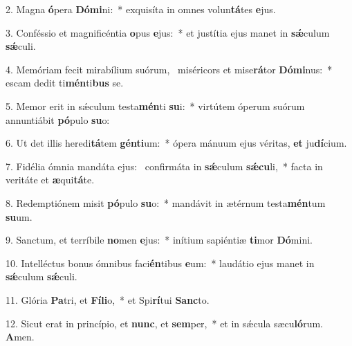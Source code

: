 2. Magna \textbf{ó}pera \textbf{Dó}\textbf{mi}ni:~*  exquisíta in omnes volun\textbf{tá}tes \textbf{e}jus.\

3. Conféssio et magnificéntia \textbf{o}pus \textbf{e}jus:~*  et justítia ejus manet in \textbf{sǽ}culum \textbf{sǽ}culi.\

4. Memóriam fecit mirabílium suórum, \dag\  miséricors et mise\textbf{rá}tor \textbf{Dó}\textbf{mi}nus:~*  escam dedit ti\textbf{mén}ti\textbf{bus} se.\

5. Memor erit in sǽculum testa\textbf{mén}ti \textbf{su}i:~*  virtútem óperum suórum annuntiábit \textbf{pó}pulo \textbf{su}o:\

6. Ut det illis heredi\textbf{tá}tem \textbf{gén}\textbf{ti}um:~*  ópera mánuum ejus véritas, \textbf{et} ju\textbf{dí}cium.\

7. Fidélia ómnia mandáta ejus: \dag\  confirmáta in \textbf{sǽ}culum \textbf{sǽ}\textbf{cu}li,~*  facta in veritáte et \textbf{æ}qui\textbf{tá}te.\

8. Redemptiónem misit \textbf{pó}pulo \textbf{su}o:~*  mandávit in ætérnum testa\textbf{mén}tum \textbf{su}um.\

9. Sanctum, et terríbile \textbf{no}men \textbf{e}jus:~*  inítium sapiéntiæ \textbf{ti}mor \textbf{Dó}mini.\

10. Intelléctus bonus ómnibus faci\textbf{én}tibus \textbf{e}um:~*  laudátio ejus manet in \textbf{sǽ}culum \textbf{sǽ}culi.\

11. Glória \textbf{Pa}tri, et \textbf{Fí}\textbf{li}o,~*  et Spi\textbf{rí}tui \textbf{Sanc}to.\

12. Sicut erat in princípio, et \textbf{nunc}, et \textbf{sem}per,~*  et in sǽcula sæcu\textbf{ló}rum. \textbf{A}men.\

